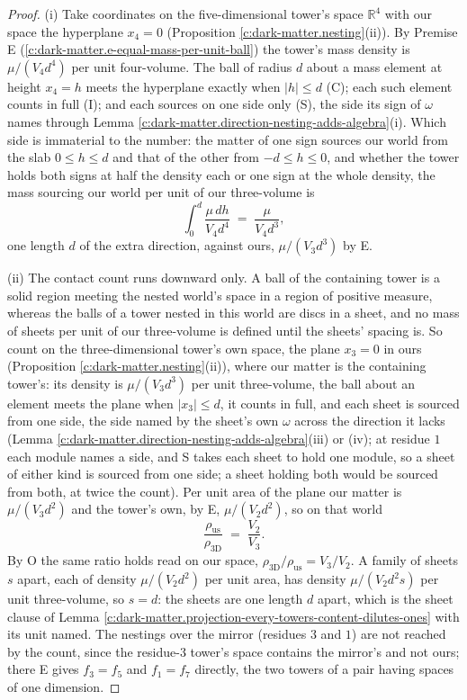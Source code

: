 \documentclass[11pt]{article}
\theoremstyle{definition}
\theoremstyle{plain}
\providecommand{\R}{}\renewcommand{\R}{\mathbb{R}}
\begin{document}
\begin{proof}
(i) Take coordinates on the five-dimensional tower's space $\R^{4}$ with our space the hyperplane $x_{4} = 0$ (Proposition \ref{c:dark-matter.nesting}(ii)). By Premise E (\ref{c:dark-matter.e-equal-mass-per-unit-ball}) the tower's mass density is $\mu/(V_{4}d^{4})$ per unit four-volume. The ball of radius $d$ about a mass element at height $x_{4} = h$ meets the hyperplane exactly when $|h| \leq d$ (C); each such element counts in full (I); and each sources on one side only (S), the side its sign of $\omega$ names through Lemma \ref{c:dark-matter.direction-nesting-adds-algebra}(i). Which side is immaterial to the number: the matter of one sign sources our world from the slab $0 \leq h \leq d$ and that of the other from $-d \leq h \leq 0$, and whether the tower holds both signs at half the density each or one sign at the whole density, the mass sourcing our world per unit of our three-volume is
\[
\int_{0}^{d}\frac{\mu\,dh}{V_{4}d^{4}} \;=\; \frac{\mu}{V_{4}d^{3}},
\]
one length $d$ of the extra direction, against ours, $\mu/(V_{3}d^{3})$ by E.

(ii) The contact count runs downward only. A ball of the containing tower is a solid region meeting the nested world's space in a region of positive measure, whereas the balls of a tower nested in this world are discs in a sheet, and no mass of sheets per unit of our three-volume is defined until the sheets' spacing is. So count on the three-dimensional tower's own space, the plane $x_{3} = 0$ in ours (Proposition \ref{c:dark-matter.nesting}(ii)), where our matter is the containing tower's: its density is $\mu/(V_{3}d^{3})$ per unit three-volume, the ball about an element meets the plane when $|x_{3}| \leq d$, it counts in full, and each sheet is sourced from one side, the side named by the sheet's own $\omega$ across the direction it lacks (Lemma \ref{c:dark-matter.direction-nesting-adds-algebra}(iii) or (iv); at residue $1$ each module names a side, and S takes each sheet to hold one module, so a sheet of either kind is sourced from one side; a sheet holding both would be sourced from both, at twice the count). Per unit area of the plane our matter is $\mu/(V_{3}d^{2})$ and the tower's own, by E, $\mu/(V_{2}d^{2})$, so on that world
\[
\frac{\rho_{\mathrm{us}}}{\rho_{3\mathrm{D}}} \;=\; \frac{V_{2}}{V_{3}} .
\]
By O the same ratio holds read on our space, $\rho_{3\mathrm{D}}/\rho_{\mathrm{us}} = V_{3}/V_{2}$. A family of sheets $s$ apart, each of density $\mu/(V_{2}d^{2})$ per unit area, has density $\mu/(V_{2}d^{2}s)$ per unit three-volume, so $s = d$: the sheets are one length $d$ apart, which is the sheet clause of Lemma \ref{c:dark-matter.projection-every-towers-content-dilutes-ones} with its unit named. The nestings over the mirror (residues $3$ and $1$) are not reached by the count, since the residue-$3$ tower's space contains the mirror's and not ours; there E gives $f_{3} = f_{5}$ and $f_{1} = f_{7}$ directly, the two towers of a pair having spaces of one dimension.


\end{proof}
\end{document}
